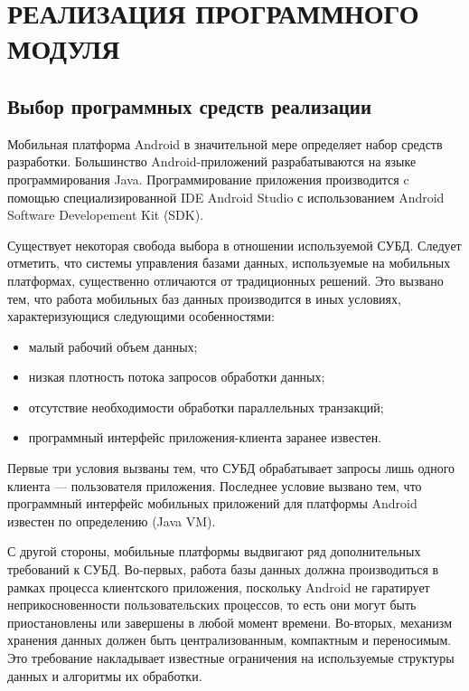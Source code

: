 \section[Реализация программного модуля]{%
  РЕАЛИЗАЦИЯ ПРОГРАММНОГО МОДУЛЯ
}\label{sec:implementation}

\subsection{Выбор программных средств реализации}

Мобильная платформа Android в значительной мере
определяет набор средств разработки. Большинство Android-приложений
разрабатываются на языке программирования Java. Программирование
приложения производится c помощью специализированной
IDE Android Studio с использованием Android Software Developement Kit (SDK).

Существует некоторая свобода выбора в отношении используемой СУБД.
Следует отметить, что системы управления базами данных,
используемые на мобильных платформах, существенно отличаются
от традиционных решений.
Это вызвано тем, что работа мобильных баз данных производится в
иных условиях, характеризующися следующими особенностями:
\begin{itemize}
  \item малый рабочий объем данных;
  \item низкая плотность потока запросов обработки данных;
  \item отсутствие необходимости обработки параллельных транзакций;
  \item программный интерфейс приложения-клиента заранее известен.
\end{itemize}

Первые три условия вызваны тем, что СУБД обрабатывает запросы
лишь одного клиента --- пользователя приложения.
Последнее условие вызвано тем, что программный интерфейс мобильных
приложений для платформы Android известен по определению (Java VM).

С другой стороны, мобильные платформы выдвигают ряд
дополнительных требований к СУБД.
Во-первых, работа базы данных должна производиться в рамках
процесса клиентского приложения, поскольку Android не гаратирует
неприкосновенности пользовательских процессов, то есть они могут быть
приостановлены или завершены в любой момент времени.
Во-вторых, механизм хранения данных должен быть централизованным,
компактным и переносимым. Это требование накладывает
известные ограничения на используемые структуры данных
и алгоритмы их обработки.

